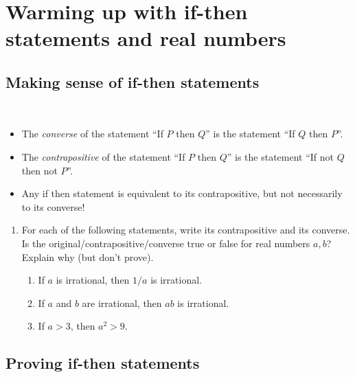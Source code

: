 \documentclass[12pt]{amsart}
\begin{document}
	
	\thispagestyle{empty}
	
	\section*{Warming up with if-then statements and real numbers}
	
\subsection*{Making sense of if-then statements}

\

\begin{framed}
\begin{itemize}
\item The \emph{converse} of the statement  ``If $P$ then $Q$'' is the statement  ``If $Q$ then $P$''.
\item The \emph{contrapositive} of the statement  ``If $P$ then $Q$'' is the statement  ``If not $Q$ then not $P$''.
\item Any if then statement is equivalent to its contrapositive, but not necessarily to its converse!
\end{itemize}
\end{framed}




\begin{enumerate}
\item For each of the following statements, write its contrapositive and its converse. Is the original/contrapositive/converse true or false for real numbers $a,b$? Explain why (but don't prove). 
\begin{enumerate}
\item If $a$ is irrational, then $1/a$ is irrational.
\item If $a$ and $b$ are irrational, then $ab$ is irrational.
\item If $a>3$, then $a^2>9$.
\end{enumerate}
\end{enumerate}





\subsection*{Proving if-then statements}

\
\end{document}

